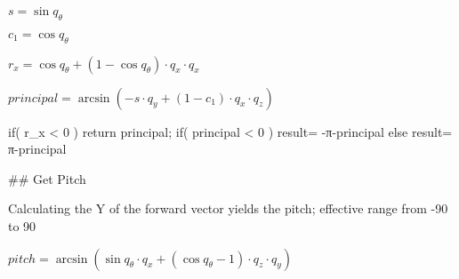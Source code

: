 $ s = \sin q_θ$

$ c_1 = \cos q_θ$

$ r_x = \cos q_θ      + (1- \cos q_θ) \cdot q_x \cdot q_x $

$ {principal} = \arcsin( -s \cdot q_y  + (1- c_1)\cdot q_x \cdot q_z)$

    if( r_x < 0 ) return principal;
    if( principal < 0 ) {
        result= -π-principal
    } else {
        result= π-principal
    }                           	
	


## Get Pitch

Calculating the Y of the forward vector yields the pitch; effective range from -90 to 90

$ {pitch} = \arcsin ( \sin  q_θ \cdot q_x + (\cos q_θ-1) \cdot q_z \cdot q_y ) $

